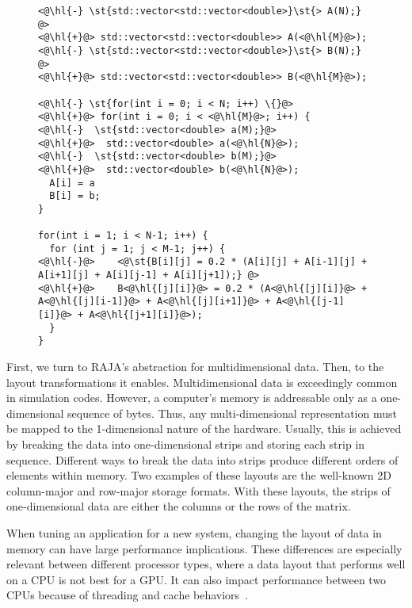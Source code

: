 \begin{figure}
\begin{lstlisting}[caption={Code changes required to switch from row- to column-major order in the C++ implementation of the 5 point stencil.},label=stencilCppColumn]
<@\hl{-} \st{std::vector<std::vector<double>}\st{> A(N);} @>
<@\hl{+}@> std::vector<std::vector<double>> A(<@\hl{M}@>);
<@\hl{-} \st{std::vector<std::vector<double>}\st{> B(N);} @>
<@\hl{+}@> std::vector<std::vector<double>> B(<@\hl{M}@>);

<@\hl{-} \st{for(int i = 0; i < N; i++) \{}@>
<@\hl{+}@> for(int i = 0; i < <@\hl{M}@>; i++) {
<@\hl{-}  \st{std::vector<double> a(M);}@>
<@\hl{+}@>  std::vector<double> a(<@\hl{N}@>);
<@\hl{-}  \st{std::vector<double> b(M);}@>
<@\hl{+}@>  std::vector<double> b(<@\hl{N}@>);
  A[i] = a
  B[i] = b;
}

for(int i = 1; i < N-1; i++) {
  for (int j = 1; j < M-1; j++) {
<@\hl{-}@>    <@\st{B[i][j] = 0.2 * (A[i][j] + A[i-1][j] + A[i+1][j] + A[i][j-1] + A[i][j+1]);} @>
<@\hl{+}@>    B<@\hl{[j][i]}@> = 0.2 * (A<@\hl{[j][i]}@> + A<@\hl{[j][i-1]}@> + A<@\hl{[j][i+1]}@> + A<@\hl{[j-1][i]}@> + A<@\hl{[j+1][i]}@>);
  }
}
\end{lstlisting}
\end{figure}
First, we turn to RAJA's abstraction for multidimensional data.
Then, to the layout transformations it enables.
Multidimensional data is exceedingly common in simulation codes.
However, a computer's memory is addressable only as a one-dimensional sequence of bytes.
Thus, any multi-dimensional representation must be mapped to the 1-dimensional nature of the hardware.
Usually, this is achieved by breaking the data into one-dimensional strips and storing each strip in sequence.
Different ways to break the data into strips produce different orders of elements within memory.
Two examples of these layouts are the well-known 2D column-major and row-major storage formats.
With these layouts, the strips of one-dimensional data are either the columns or the rows of the matrix.

When tuning an application for a new system, changing the layout of data in memory can have large performance implications.
These differences are especially relevant between different processor types, where a data layout that performs well on a CPU is not best for a GPU\@.
It can also impact performance between two CPUs because of threading and cache behaviors~\cite{trott2021kokkos}.


